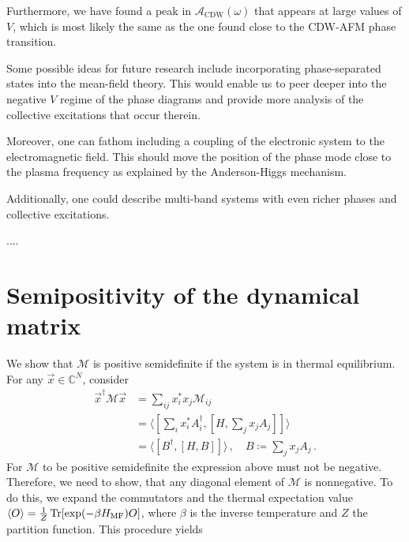 \documentclass[
    reprint, 
    aps,
    preprintnumbers,
    twocolumn,
    prb,
    superscriptaddress
]{revtex4-2}
\newcommand{\mM}{\mathcal{M}}
\newcommand{\spectral}[1]{\mathcal{A}_\text{#1}  (\omega)}
\begin{document}
Furthermore, we have found a peak in $\spectral{CDW}$ that appears at large values of $V$, 
which is most likely the same as the one found close to the CDW-AFM phase transition. 


Some possible ideas for future research include incorporating phase-separated states into the mean-field theory.
This would enable us to peer deeper into the negative $V$ regime of the phase diagrams and provide more analysis of the collective excitations that occur therein.

Moreover, one can fathom including a coupling of the electronic system to the electromagnetic field.
This should move the position of the phase mode close to the plasma frequency as explained by the Anderson-Higgs mechanism.

Additionally, one could describe multi-band systems with even richer phases and collective excitations. 


\begin{acknowledgments} 
    ....
\end{acknowledgments}

\appendix
\section{Semipositivity of the dynamical matrix}
\label{sec:positive_M}

We show that $\mathcal{M}$ is positive semidefinite if the system is in thermal equilibrium.
For any $\vec{x} \in \mathbb{C}^N$, consider
\begin{align}
    \vec{x}^\dagger \mM \vec{x} &= \sum_{ij} x_i^* x_j \mM_{ij} \nonumber \\
        &= \langle \left[ \sum_i x_i^* A_i^\dagger, \left[ H, \sum_j x_j A_j \right] \right]  \rangle \nonumber \\
        &= \langle [B^\dagger, [H, B]] \rangle\,,\quad B \coloneqq  \sum_j x_j A_j\,.
\end{align}
For $\mM$ to be positive semidefinite the expression above must not be negative.
Therefore, we need to show, that any diagonal element of $\mM$ is nonnegative.
To do this, we expand the commutators and the thermal expectation value $\langle O \rangle = \frac{1}{Z} \Trace [\exp(-\beta H_\text{MF}) O]$, 
where $\beta$ is the inverse temperature and $Z$ the partition function.
This procedure yields
\end{document}
